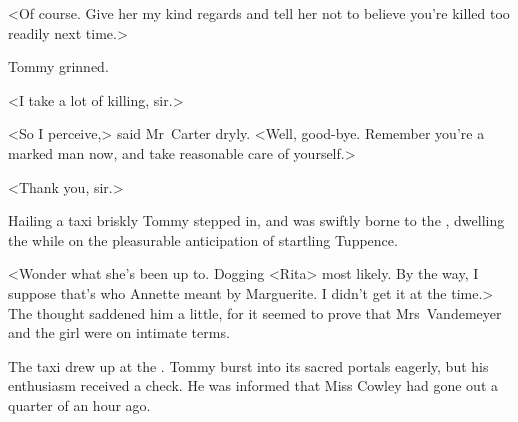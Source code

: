 <Of course. Give her my kind regards and tell her not to believe you're killed too readily next time.>

Tommy grinned.

<I take a lot of killing, sir.>

<So I perceive,> said Mr~Carter dryly. <Well, good-bye. Remember you're a marked man now, and take reasonable care of yourself.>

<Thank you, sir.>

Hailing a taxi briskly Tommy stepped in, and was swiftly borne to the , dwelling the while on the pleasurable anticipation of startling Tuppence.

<Wonder what she's been up to. Dogging <Rita> most likely. By the way, I suppose that's who Annette meant by Marguerite. I didn't get it at the time.> The thought saddened him a little, for it seemed to prove that Mrs~Vandemeyer and the girl were on intimate terms.

The taxi drew up at the . Tommy burst into its sacred portals eagerly, but his enthusiasm received a check. He was informed that Miss Cowley had gone out a quarter of an hour ago. 